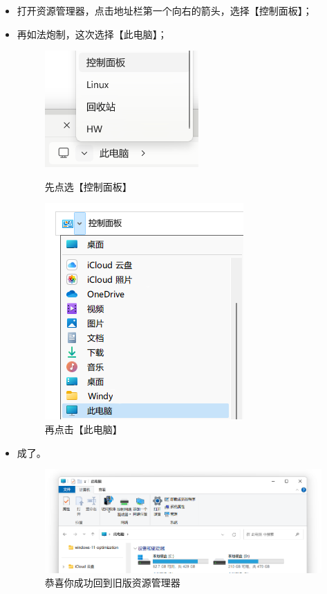 \begin{itemize}
  \item 打开资源管理器，点击地址栏第一个向右的箭头，选择【控制面板】；
  \item 再如法炮制，这次选择【此电脑】；
    \begin{figure}[htb!]
      \begin{minipage}{.49\textwidth}
        \centering
        \includegraphics[width=.6\textwidth]{assets/advanced/go-to-control.png}
        \caption{先点选【控制面板】}
        \label{fig:go-to-control}
      \end{minipage}
      \begin{minipage}{.49\textwidth}
        \centering
        \includegraphics[width=.6\textwidth]{assets/advanced/back-to-this-pc.png}
        \caption{再点击【此电脑】}
        \label{fig:back-to-this-pc}
      \end{minipage}
    \end{figure}
  \item 成了。
    \begin{figure}[htb!]
      \centering
      \includegraphics[width=.65\textwidth]{assets/advanced/old-explorer.png}
      \caption{恭喜你成功回到旧版资源管理器}
      \label{fig:old-explorer}
    \end{figure}
\end{itemize}

